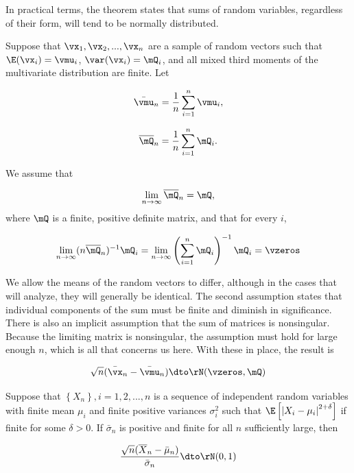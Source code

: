\documentclass[english,12pt]{book}\usepackage[]{graphicx}\usepackage[]{xcolor}
\begin{document}
In practical terms, the theorem states that sums of random variables, regardless of their form, will tend to be normally distributed. 


\begin{theorem}\label{theorem:LF_CLT_M}
Suppose that $\vx_1, \vx_2,...,\vx_n$ are a sample of random vectors such that $\E(\vx_i) = \vmu_i$, $\var(\vx_i) = \mQ_i$, and all mixed third moments of the multivariate distribution are finite. Let

\begin{equation*}
  \bar{\vmu}_n = \frac{1}{n}\sum_{i = 1}^n\vmu_i,
\end{equation*}

\begin{equation*}
  \overline{\mQ}_n = \frac{1}{n}\sum_{i = 1}^n\mQ_i.
\end{equation*}

We assume that

\begin{equation*}
  \lim_{n \to \infty}\overline{\mQ}_n  = \mQ,
\end{equation*}
%
where $\mQ$ is a finite, positive definite matrix, and that for every $i$,

\begin{equation*}
  \lim_{n \to \infty}(n\overline{\mQ}_n)^{-1}\mQ_i = \lim_{n \to \infty}\left(\sum_{i = 1}^n \mQ_i\right)^{-1} \mQ_i = \vzeros
\end{equation*}

We allow the means of the random vectors to differ, although in the cases that will analyze, they will generally be identical. The second assumption states that individual components of the sum must be finite and diminish in significance. There is also an implicit assumption that the sum of matrices is nonsingular. Because the limiting matrix is nonsingular, the assumption must hold for large enough $n$, which is all that concerns us here. With these in place, the result is

\begin{equation*}
  \sqrt{n}(\bar{\vx}_n - \bar{\vmu}_n)\dto \rN(\vzeros, \mQ)
\end{equation*}
\end{theorem}

\begin{theorem}
Suppose that $\left\lbrace X_n\right\rbrace, i = 1, 2,...,n$ is a sequence of independent random variables with finite mean $\mu_i$ and finite positive variances $\sigma^2_i$ such that $\E\left[\left|X_i - \mu_i\right|^{2 + \delta}\right]$ if finite for some $\delta > 0$. If $\bar{\sigma}_n$ is positive and finite for all $n$ sufficiently large, then

\begin{equation*}
  \frac{\sqrt{n}(\overline{X}_n - \bar{\mu}_n)}{\bar{\sigma}_n}\dto\rN(0, 1)
\end{equation*}
\end{theorem}
\end{document}
